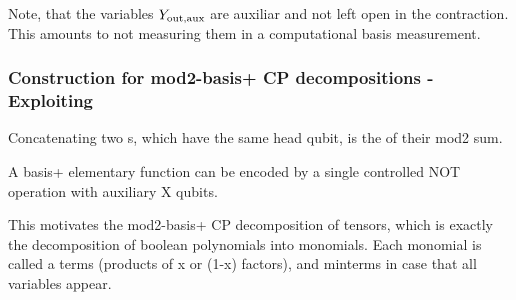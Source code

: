 
Note, that the variables $Y_{\mathrm{out},\mathrm{aux}}$ are auxiliar and not left open in the contraction.
This amounts to not measuring them in a computational basis measurement.

\subsubsection{Construction for mod2-basis+ CP decompositions - Exploiting \PolynomialSparsity{}}

Concatenating two \computationCircuit{}s, which have the same head qubit, is the \computationCircuit{} of their mod2 sum.

A basis+ elementary function can be encoded by a single controlled NOT operation with auxiliary X qubits.

This motivates the mod2-basis+ CP decomposition of tensors, which is exactly the decomposition of boolean polynomials into monomials.
Each monomial is called a terms (products of x or (1-x) factors), and minterms in case that all variables appear.

